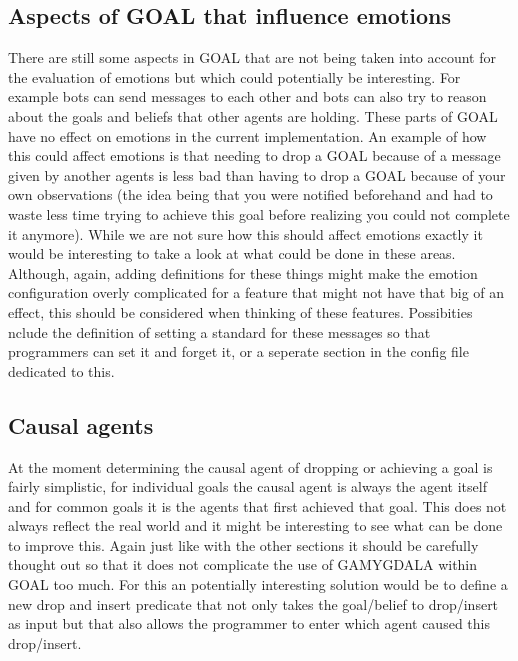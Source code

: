 \documentclass[11pt]{article}
\begin{document}
\subsection{Aspects of GOAL that influence emotions}
There are still some aspects in GOAL that are not being taken into account for the evaluation of emotions but which could potentially be interesting. For example bots can send messages to each other and bots can also try to reason about the goals and beliefs that other agents are holding. These parts of GOAL have no effect on emotions in the current implementation. An example of how this could affect emotions is that needing to drop a GOAL because of a message given by another agents is less bad than having to drop a GOAL because of your own observations (the idea being that you were notified beforehand and had to waste less time trying to achieve this goal before realizing you could not complete it anymore). While we are not sure how this should affect emotions exactly it would be interesting to take a look at what could be done in these areas. Although, again, adding definitions for these things might make the emotion configuration overly complicated for a feature that might not have that big of an effect, this should be considered when thinking of these features. Possibities nclude the definition of setting a standard for these messages so that programmers can set it and forget it, or a seperate section in the config file dedicated to this.

\subsection{Causal agents}
At the moment determining the causal agent of dropping or achieving a goal is fairly simplistic, for individual goals the causal agent is always the agent itself and for common goals it is the agents that first achieved that goal. This does not always reflect the real world and it might be interesting to see what can be done to improve this. Again just like with the other sections it should be carefully thought out so that it does not complicate the use of GAMYGDALA within GOAL too much. For this an potentially interesting solution would be to define a new drop and insert predicate that not only takes the goal/belief to drop/insert as input but that also allows the programmer to enter which agent caused this drop/insert.
\end{document}

